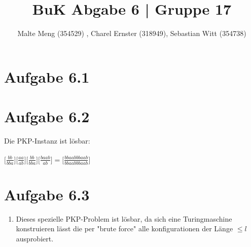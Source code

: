 \documentclass{article}
\title{BuK Abgabe 6 | Gruppe 17}
\author{Malte Meng (354529) , Charel Ernster (318949), Sebastian Witt (354738)}
\begin{document}
	\maketitle 
	\section[a 6.1]{Aufgabe 6.1}
	\section[a 6.2]{Aufgabe 6.2}
	Die PKP-Instanz ist lösbar:\\\\
	$
	\Big[ \frac{bb}{bba} \Big]
	\Big[ \frac{aa}{ab} \Big]
	\Big[ \frac{bb}{bba} \Big]
	\Big[ \frac{baab}{ab} \Big]
	=
	\Big[ \frac{bbaabbbaab}{bbaabbbaab}\Big]
	$\\
	\section[a 6.3]{Aufgabe 6.3}
	\begin{enumerate}[label=(\alph*).]
		\item Dieses spezielle PKP-Problem ist lösbar, da sich eine Turingmaschine konstruieren lässt die per "brute force" alle konfigurationen der Länge $\leq l$  ausprobiert.
	\end{enumerate}
\end{document}
